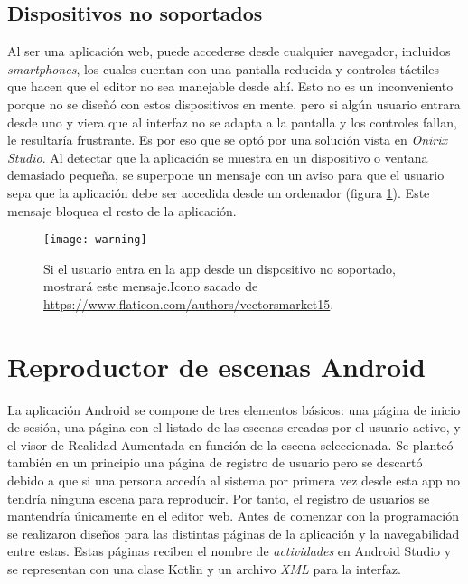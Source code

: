 \subsection{Dispositivos no soportados}

Al ser una aplicación web, puede accederse desde cualquier navegador, incluidos \textit{smartphones}, los cuales cuentan con una pantalla reducida y controles táctiles que hacen que el editor no sea manejable desde ahí. Esto no es un inconveniento porque no se diseñó con estos dispositivos en mente, pero si algún usuario entrara desde uno y viera que al interfaz no se adapta a la pantalla y los controles fallan, le resultaría frustrante. Es por eso que se optó por una solución vista en \textit{Onirix Studio}\cite{onirix}. Al detectar que la aplicación se muestra en un dispositivo o ventana demasiado pequeña, se superpone un mensaje con un aviso para que el usuario sepa que la aplicación debe ser accedida desde un ordenador (figura \ref{fig:warning}). Este mensaje bloquea el resto de la aplicación.

\begin{figure}[h]
    \centering
    \texttt{[image: warning]}
    \caption[Mensaje de advertencia para dispositvos no soportados]{Si el usuario entra en la app desde un dispositivo no soportado, mostrará este mensaje.Icono sacado de \url{https://www.flaticon.com/authors/vectorsmarket15}.}
    \label{fig:warning}
\end{figure}


\section{Reproductor de escenas Android}

La aplicación Android se compone de tres elementos básicos: una página de inicio de sesión, una página con el listado de las escenas creadas por el usuario activo, y el visor de Realidad Aumentada en función de la escena seleccionada. Se planteó también en un principio una página de registro de usuario pero se descartó debido a que si una persona accedía al sistema por primera vez desde esta app no tendría ninguna escena para reproducir. Por tanto, el registro de usuarios se mantendría únicamente en el editor web. Antes de comenzar con la programación se realizaron diseños para las distintas páginas de la aplicación y la navegabilidad entre estas. Estas páginas reciben el nombre de \textit{actividades} en Android Studio y se representan con una clase Kotlin y un archivo \textit{XML} para la interfaz.

